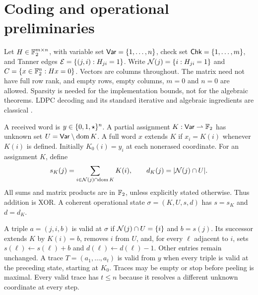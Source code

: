 \section{Coding and operational preliminaries}
\label{sec:core}
Let $H\in\mathbb{F}_2^{m\times n}$, with variable set $\mathsf{Var}=\{1,\ldots,n\}$,
check set $\mathsf{Chk}=\{1,\ldots,m\}$, and Tanner edges
$\mathcal{E}=\{(j,i):H_{ji}=1\}$. Write $\mathcal{N}(j)=\{i:H_{ji}=1\}$ and
$C=\{x\in\mathbb{F}_2^n:Hx=0\}$. Vectors are columns throughout.
The matrix need not have full row rank, and empty rows, empty columns,
$m=0$ and $n=0$ are allowed. Sparsity is needed for the implementation
bounds, not for the algebraic theorems. LDPC decoding and its standard
iterative and algebraic ingredients are classical
\cite{Gallager1962,RichardsonUrbanke2008,LubyMitzenmacherShokrollahiSpielman2001,BurshteinMiller2004ML}.

A received word is $y\in\{0,1,\star\}^n$. A partial assignment
$K:\mathsf{Var}\rightharpoonup\mathbb{F}_2$ has unknown set
$U=\mathsf{Var}\setminus\operatorname{dom}K$. A full word $x$ extends $K$ if
$x_i=K(i)$ whenever $K(i)$ is defined. Initially $K_0(i)=y_i$ at each
nonerased coordinate. For an assignment $K$, define
\begin{equation}\label{eq:operational-state}
 s_K(j)=\sum_{i\in\mathcal{N}(j)\cap\operatorname{dom}K}K(i),
 \qquad d_K(j)=|\mathcal{N}(j)\cap U|.
\end{equation}
All sums and matrix products are in $\mathbb{F}_2$, unless explicitly stated
otherwise. Thus addition is XOR. A coherent operational state
$\sigma=(K,U,s,d)$ has $s=s_K$ and $d=d_K$.

\begin{defi}\label{def:peeling}
A triple $a=(j,i,b)$ is valid at $\sigma$ if
$\mathcal{N}(j)\cap U=\{i\}$ and $b=s(j)$. Its successor extends $K$ by
$K(i)=b$, removes $i$ from $U$, and, for every $\ell$ adjacent to $i$,
sets $s(\ell)\leftarrow s(\ell)+b$ and
$d(\ell)\leftarrow d(\ell)-1$. Other entries remain unchanged.
A trace $T=(a_1,\ldots,a_t)$ is valid from $y$ when every triple is valid
at the preceding state, starting at $K_0$. Traces may be empty or stop
before peeling is maximal. Every valid trace has $t\leq n$ because it
resolves a different unknown coordinate at every step.
\end{defi}

